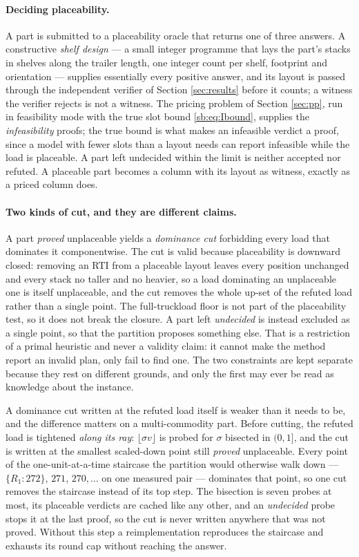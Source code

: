 \paragraph{Deciding placeability.}
A part is submitted to a placeability oracle that returns one of three
answers. A constructive \emph{shelf design} --- a small integer
programme that lays the part's stacks in shelves along the trailer
length, one integer count per shelf, footprint and orientation ---
supplies essentially every positive answer, and its layout is passed
through the independent verifier of Section \ref{sec:results} before it
counts; a witness the verifier rejects is not a witness. The pricing
problem of Section \ref{sec:pp}, run in feasibility mode with the true
slot bound \eqref{sb:eq:Ibound}, supplies the \emph{infeasibility}
proofs; the true bound is what makes an infeasible verdict a proof,
since a model with fewer slots than a layout needs can report
infeasible while the load is placeable. A part left undecided within
the limit is neither accepted nor refuted. A placeable part becomes a
column with its layout as witness, exactly as a priced column does.

\paragraph{Two kinds of cut, and they are different claims.}
A part \emph{proved} unplaceable yields a \emph{dominance cut}
forbidding every load that dominates it componentwise. The cut is valid
because placeability is downward closed: removing an RTI from a
placeable layout leaves every position unchanged and every stack no
taller and no heavier, so a load dominating an unplaceable one is itself
unplaceable, and the cut removes the whole up-set of the refuted load
rather than a single point. The full-truckload floor is not part of the
placeability test, so it does not break the closure. A part left
\emph{undecided} is instead excluded as a single point, so that the
partition proposes something else. That is a restriction of a primal
heuristic and never a validity claim: it cannot make the method report
an invalid plan, only fail to find one. The two constraints are kept
separate because they rest on different grounds, and only the first may
ever be read as knowledge about the instance.

A dominance cut written at the refuted load itself is weaker than it
needs to be, and the difference matters on a multi-commodity part.
Before cutting, the refuted load is tightened \emph{along its ray}:
$\lfloor\sigma v\rfloor$ is probed for $\sigma$ bisected in $(0,1]$,
and the cut is written at the smallest scaled-down point still
\emph{proved} unplaceable. Every point of the one-unit-at-a-time
staircase the partition would otherwise walk down --- $\{R_{1}:272\}$,
$271$, $270,\dots$ on one measured pair --- dominates that point, so one
cut removes the staircase instead of its top step. The bisection is
seven probes at most, its placeable verdicts are cached like any other,
and an \emph{undecided} probe stops it at the last proof, so the cut is
never written anywhere that was not proved. Without this step a
reimplementation reproduces the staircase and exhausts its round cap
without reaching the answer.

